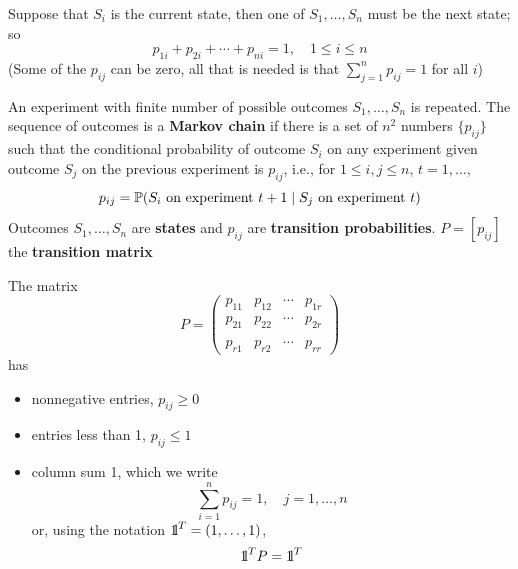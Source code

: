 \documentclass[aspectratio=169]{beamer}
\begin{document}
\begin{frame} 
Suppose that $S_i$ is the current state, then one of $S_1, \ldots,S_n$ must be the next state; so
\[
p_{1i}+p_{2i}+\cdots+p_{ni}=1, \quad 1\leq i\leq n
\]
(Some of the $p_{ij}$ can be zero, all that is needed is that $\sum_{j=1}^n p_{ij}=1$ for all $i$)
\vfill
\begin{definition}
An experiment with finite number of possible outcomes $S_1,\ldots,S_n$ is repeated. The sequence of outcomes is a \textbf{Markov chain} if there is a set of $n^2$ numbers $\{p_{ij}\}$ such that the conditional probability of outcome $S_i$ on any experiment given outcome $S_j$ on the previous experiment is $p_{ij}$, i.e., for $1\leq i,j\leq n$, $t=1,\ldots$,
\[
	p_{ij}=\mathbb{P}(S_i\textrm{ on experiment }t+1\;|\;
	S_j\textrm{ on experiment }t)	
\]
Outcomes $S_1,\ldots,S_n$ are \textbf{states} and $p_{ij}$ are \textbf{transition probabilities}. $P=[p_{ij}]$ the \textbf{transition matrix}
\end{definition}
\end{frame}


\begin{frame} 
The matrix 
\[
P=
\begin{pmatrix}
p_{11} & p_{12} & \cdots & p_{1r} \\
p_{21} & p_{22} & \cdots & p_{2r} \\
&&& \\
p_{r1} & p_{r2} & \cdots & p_{rr}
\end{pmatrix}
\]
has
\begin{itemize}
\item nonnegative entries, $p_{ij}\geq 0$
\item entries less than 1, $p_{ij}\leq 1$
\item column sum 1, which we write
\[
\sum_{i=1}^n p_{ij}=1,\quad j=1,\ldots,n
\]
or, using the notation $\nbOne^T=(1,\ldots,1)$,
\[
\nbOne^TP=\nbOne^T
\]
\end{itemize}
\end{frame}


\end{document}
